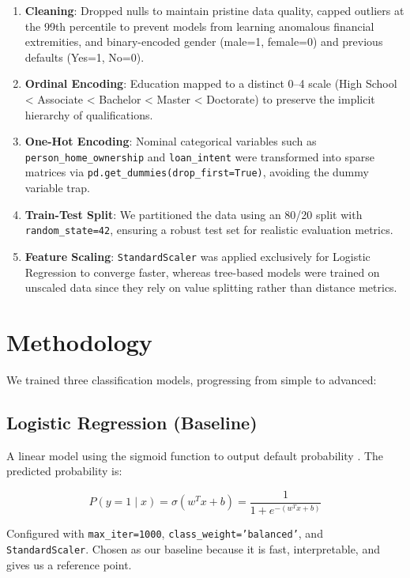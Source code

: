 \documentclass[12pt, a4paper]{article}
\begin{document}
\begin{enumerate}[leftmargin=2cm]
  \item \textbf{Cleaning}: Dropped nulls to maintain pristine data quality, capped outliers at the 99th percentile to prevent models from learning anomalous financial extremities, and binary-encoded gender (male=1, female=0) and previous defaults (Yes=1, No=0).
  \item \textbf{Ordinal Encoding}: Education mapped to a distinct 0--4 scale (High School < Associate < Bachelor < Master < Doctorate) to preserve the implicit hierarchy of qualifications.
  \item \textbf{One-Hot Encoding}: Nominal categorical variables such as \texttt{person\_home\_ownership} and \texttt{loan\_intent} were transformed into sparse matrices via \texttt{pd.get\_dummies(drop\_first=True)}, avoiding the dummy variable trap.
  \item \textbf{Train-Test Split}: We partitioned the data using an 80/20 split with \texttt{random\_state=42}, ensuring a robust test set for realistic evaluation metrics.
  \item \textbf{Feature Scaling}: \texttt{StandardScaler} was applied exclusively for Logistic Regression to converge faster, whereas tree-based models were trained on unscaled data since they rely on value splitting rather than distance metrics.
\end{enumerate}

\section{Methodology}

We trained three classification models, progressing from simple to advanced:

\subsection{Logistic Regression (Baseline)}

A linear model using the sigmoid function to output default probability \cite{sklearn}. The predicted probability is:

\begin{equation}
P(y=1 \mid x) = \sigma(w^T x + b) = \frac{1}{1 + e^{-(w^T x + b)}}
\end{equation}

Configured with \texttt{max\_iter=1000}, \texttt{class\_weight='balanced'}, and \texttt{StandardScaler}. Chosen as our baseline because it is fast, interpretable, and gives us a reference point.
\end{document}
